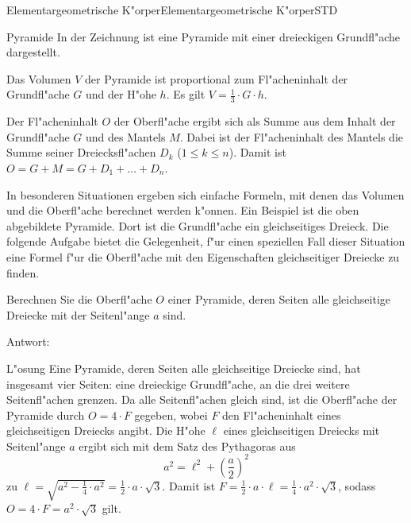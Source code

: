 \begin{MXContent}{Elementargeometrische K"orper}{Elementargeometrische K"orper}{STD}
\begin{MXInfo}{Pyramide}
In der Zeichnung ist eine Pyramide mit einer dreieckigen Grundfl"ache 
dargestellt.

Das Volumen $V$ der Pyramide ist proportional zum Fl"acheninhalt der 
Grundfl"ache $G$ und der H"ohe $h$. 
Es gilt $V = \frac{1}{3} \cdot G \cdot h$.

Der Fl"acheninhalt $O$ der Oberfl"ache ergibt sich als Summe aus dem Inhalt 
der Grundfl"ache $G$ und des Mantels $M$. Dabei ist der Fl"acheninhalt des 
Mantels die Summe seiner Dreiecksfl"achen $D_k$ ($1 \leq k \leq n$).
Damit ist $O = G + M = G + D_1 + \ldots + D_n$.
\end{MXInfo}

In besonderen Situationen ergeben sich einfache Formeln, mit denen 
das Volumen und die Oberfl"ache berechnet werden k"onnen. Ein Beispiel ist
die oben abgebildete Pyramide. Dort ist die Grundfl"ache ein gleichseitiges 
Dreieck. Die folgende Aufgabe bietet die Gelegenheit, f"ur einen speziellen
Fall dieser Situation eine Formel f"ur %
die Oberfl"ache mit den 
Eigenschaften gleichseitiger Dreiecke zu finden.

\begin{MExercise}
Berechnen Sie %
die Oberfl"ache $O$ einer Pyramide, deren 
Seiten alle gleichseitige Dreiecke mit der Seitenl"ange $a$ sind.

Antwort: 
{}

\begin{MHint}{L"osung}
Eine Pyramide, deren Seiten alle gleichseitige Dreiecke sind, hat insgesamt 
vier Seiten: eine dreieckige Grundfl"ache, an die drei weitere Seitenfl"achen 
grenzen. Da alle Seitenfl"achen gleich sind, ist die Oberfl"ache der Pyramide
durch $O = 4 \cdot F$ gegeben, wobei $F$ den Fl"acheninhalt eines gleichseitigen
Dreiecks angibt. Die H"ohe $\ell$ eines gleichseitigen Dreiecks mit Seitenl"ange 
$a$ ergibt sich mit dem Satz des Pythagoras aus 
\[
a^2 = \ell^2 + \left(\frac{a}{2}\right)^2 %
\]
zu 
$\ell = \sqrt{a^2 - \frac{1}{4} \cdot a^2} %
 = \frac{1}{2} \cdot a \cdot \sqrt{3}$.
Damit ist 
$F = \frac{1}{2} \cdot a \cdot \ell = \frac{1}{4} \cdot a^2 \cdot \sqrt{3}$, 
sodass
$O = 4 \cdot F = a^2 \cdot \sqrt{3}$ gilt.
\end{MHint}
\end{MExercise}



\end{MXContent}
